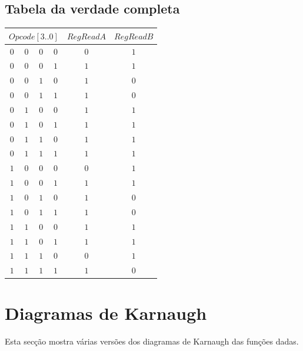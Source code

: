 \documentclass [15pt,a4paper,twoside]{article}
\begin{document}
\subsection{Tabela da verdade completa}
\begin{center}
\begin{tabular}{cccc|cc}
\multicolumn{4}{c|}{$Opcode[3..0]$}&$RegReadA$&$RegReadB$\\
\hline
$0$&$0$&$0$&$0$&$0$&$1$\\
$0$&$0$&$0$&$1$&$1$&$1$\\
$0$&$0$&$1$&$0$&$1$&$0$\\
$0$&$0$&$1$&$1$&$1$&$0$\\
$0$&$1$&$0$&$0$&$1$&$1$\\
$0$&$1$&$0$&$1$&$1$&$1$\\
$0$&$1$&$1$&$0$&$1$&$1$\\
$0$&$1$&$1$&$1$&$1$&$1$\\
$1$&$0$&$0$&$0$&$0$&$1$\\
$1$&$0$&$0$&$1$&$1$&$1$\\
$1$&$0$&$1$&$0$&$1$&$0$\\
$1$&$0$&$1$&$1$&$1$&$0$\\
$1$&$1$&$0$&$0$&$1$&$1$\\
$1$&$1$&$0$&$1$&$1$&$1$\\
$1$&$1$&$1$&$0$&$0$&$1$\\
$1$&$1$&$1$&$1$&$1$&$0$\\

\end{tabular}
\end{center}
\section{Diagramas de Karnaugh}
Esta secção mostra várias versões dos diagramas de Karnaugh das funções dadas.
\end{document}
